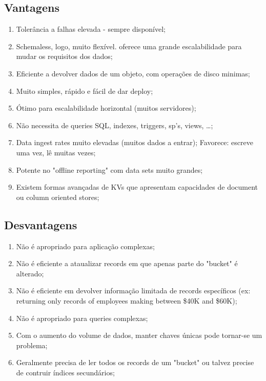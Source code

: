 \documentclass{article}
\begin{document}
\subsection{Vantagens}

\begin{enumerate}
  \item Tolerância a falhas elevada - sempre disponível;
  \item Schemaless, logo, muito flexível. oferece uma grande escalabilidade para mudar os requisitos dos dados;
  \item Eficiente a devolver dados de um objeto, com operações de disco minimas;
  \item Muito simples, rápido e fácil de dar deploy;
  \item Ótimo para escalabilidade horizontal (muitos servidores);
  \item Não necessita de queries SQL, indexes, triggers, sp's, views, \dots;
  \item Data ingest rates muito elevadas (muitos dados a entrar);
  \subitem Favorece: escreve uma vez, lê muitas vezes;
  \item Potente no "offline reporting" com data sets muito grandes;
  \item Existem formas avançadas de KVs que apresentam capacidades de document ou column oriented stores;
\end{enumerate}

\pagebreak

\subsection{Desvantagens}

\begin{enumerate}
  \item Não é apropriado para aplicação complexas;
  \item Não é eficiente a ataualizar records em que apenas parte do "bucket" é alterado;
  \item Não é eficiente em devolver informação limitada de records específicos (ex: returning only
  records of employees making between \$40K and \$60K); 
  \item Não é apropriado para queries complexas;
  \item Com o aumento do volume de dados, manter chaves únicas pode tornar-se um problema;
  \item Geralmente precisa de ler todos os records de um "bucket" ou talvez precise de contruir índices secundários;
\end{enumerate}
\end{document}
